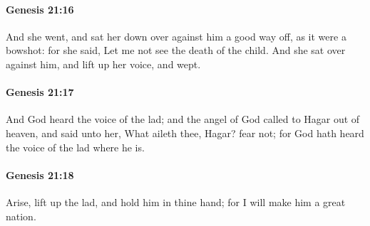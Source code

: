 		\paragraph{Genesis 21:16} %
			\label{GENESIS-21-16}

			And she went, and sat her down over against him a good way off, as it were a bowshot: for she said, Let me not see the death of the child.  And she sat over against him, and lift up her voice, and wept.


		\paragraph{Genesis 21:17} %
			\label{GENESIS-21-17}

			And God heard the voice of the lad; and the angel of God called to Hagar out of heaven, and said unto her, What aileth thee, Hagar?  fear not; for God hath heard the voice of the lad where he is.


		\paragraph{Genesis 21:18} %
			\label{GENESIS-21-18}

			Arise, lift up the lad, and hold him in thine hand; for I will make him a great nation.


